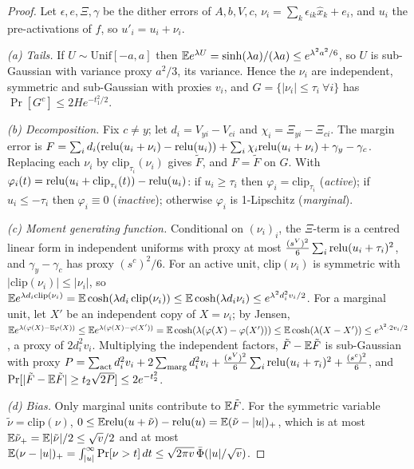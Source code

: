 \begin{proof}
Let $\epsilon,e,\Xi,\gamma$ be the dither errors of $A,b,V,c$, $\nu_i=\sum_k\epsilon_{ik}\hat x_k+e_i$, and $u_i$ the pre-activations of $f$, so $u'_i=u_i+\nu_i$.

\emph{(a) Tails.} If $U\sim\mathrm{Unif}[-a,a]$ then $\mathbb{E} e^{\lambda U}=\sinh(\lambda a)/(\lambda a)\le e^{\lambda^2a^2/6}$, so $U$ is sub-Gaussian with variance proxy $a^2/3$, its variance. Hence the $\nu_i$ are independent, symmetric and sub-Gaussian with proxies $v_i$, and $G=\{|\nu_i|\le\tau_i\ \forall i\}$ has $\Pr[G^c]\le2He^{-t_1^2/2}$.

\emph{(b) Decomposition.} Fix $c\ne y$; let $d_i=V_{yi}-V_{ci}$ and $\chi_i=\Xi_{yi}-\Xi_{ci}$. The margin error is
$F=\sum_id_i(\mathrm{relu}(u_i+\nu_i)-\mathrm{relu}(u_i))+\sum_i\chi_i\mathrm{relu}(u_i+\nu_i)+\gamma_y-\gamma_c$.
Replacing each $\nu_i$ by $\mathrm{clip}_{\tau_i}(\nu_i)$ gives $\tilde F$, and $F=\tilde F$ on $G$. With $\varphi_i(t)=\mathrm{relu}(u_i+\mathrm{clip}_{\tau_i}(t))-\mathrm{relu}(u_i)$: if $u_i\ge\tau_i$ then $\varphi_i=\mathrm{clip}_{\tau_i}$ (\emph{active}); if $u_i\le-\tau_i$ then $\varphi_i\equiv0$ (\emph{inactive}); otherwise $\varphi_i$ is 1-Lipschitz (\emph{marginal}).

\emph{(c) Moment generating function.} Conditional on $(\nu_i)_i$, the $\Xi$-term is a centred linear form in independent uniforms with proxy at most $\frac{(s^V)^2}6\sum_i\mathrm{relu}(u_i+\tau_i)^2$, and $\gamma_y-\gamma_c$ has proxy $(s^c)^2/6$. For an active unit, $\mathrm{clip}(\nu_i)$ is symmetric with $|\mathrm{clip}(\nu_i)|\le|\nu_i|$, so $\mathbb{E} e^{\lambda d_i\mathrm{clip}(\nu_i)}=\mathbb{E}\cosh(\lambda d_i\,\mathrm{clip}(\nu_i))\le\mathbb{E}\cosh(\lambda d_i\nu_i)\le e^{\lambda^2d_i^2v_i/2}$. For a marginal unit, let $X'$ be an independent copy of $X=\nu_i$; by Jensen, $\mathbb{E} e^{\lambda(\varphi(X)-\mathbb{E}\varphi(X))}\le\mathbb{E} e^{\lambda(\varphi(X)-\varphi(X'))}=\mathbb{E}\cosh(\lambda(\varphi(X)-\varphi(X')))\le\mathbb{E}\cosh(\lambda(X-X'))\le e^{\lambda^2\cdot2v_i/2}$, a proxy of $2d_i^2v_i$. Multiplying the independent factors, $\tilde F-\mathbb{E}\tilde F$ is sub-Gaussian with proxy
$P=\sum_{\mathrm{act}}d_i^2v_i+2\sum_{\mathrm{marg}}d_i^2v_i+\frac{(s^V)^2}6\sum_i\mathrm{relu}(u_i+\tau_i)^2+\frac{(s^c)^2}6$, and $\Pr[|\tilde F-\mathbb{E}\tilde F|\ge t_2\sqrt{2P}]\le2e^{-t_2^2}$.

\emph{(d) Bias.} Only marginal units contribute to $\mathbb{E}\tilde F$. For the symmetric variable $\tilde\nu=\mathrm{clip}(\nu)$, $0\le\mathbb{E}\mathrm{relu}(u+\tilde\nu)-\mathrm{relu}(u)=\mathbb{E}(\tilde\nu-|u|)_+$, which is at most $\mathbb{E}\tilde\nu_+=\mathbb{E}|\tilde\nu|/2\le\sqrt v/2$ and at most $\mathbb{E}(\nu-|u|)_+=\int_{|u|}^\infty\Pr[\nu>t]\,dt\le\sqrt{2\pi v}\,\bar\Phi(|u|/\sqrt v)$.


\end{proof}
